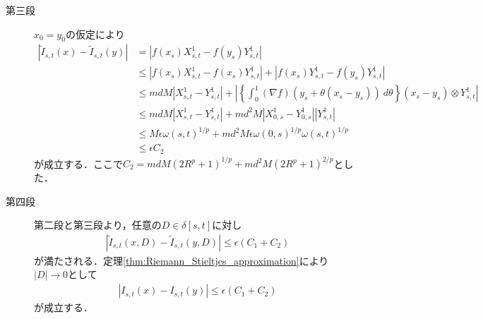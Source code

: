 \begin{prf}
\begin{description}
			\item[第三段]
				$x_0 = y_0$の仮定により
				\begin{align}
					\left| \tilde{I}_{s,t}(x) - \tilde{I}_{s,t}(y) \right|
					&= \left| f(x_s)X^1_{s,t} - f(y_s)Y^1_{s,t} \right| \\
					&\leq \left| f(x_s)X^1_{s,t} - f(x_s)Y^1_{s,t} \right|
						+ \left| f(x_s)Y^1_{s,t} - f(y_s)Y^1_{s,t} \right| \\
					&\leq mdM \left| X^1_{s,t} - Y^1_{s,t} \right|
						+ \left| \left\{ \int_0^1 (\nabla f)(y_s + \theta(x_s - y_s))\ d\theta \right\}
						(x_s - y_s) \otimes Y^1_{s,t} \right| \\
					&\leq mdM \left| X^1_{s,t} - Y^1_{s,t} \right|
						+ m d^2 M \left| X^1_{0,s} - Y^1_{0,s}\right| \left| Y^1_{s,t} \right| \\
					&\leq M \epsilon \omega(s,t)^{1/p} + m d^2 M \epsilon \omega(0,s)^{1/p} \omega(s,t)^{1/p} \\
					&\leq \epsilon C_2 
				\end{align}
				が成立する．ここで$C_2 = mdM \left( 2 R^p + 1 \right)^{1/p} + m d^2 M \left( 2 R^p + 1 \right)^{2/p}$とした．
				
			\item[第四段]
				第二段と第三段より，任意の$D \in \delta[s,t]$に対し
				\begin{align}
					\left| \tilde{I}_{s,t}(x,D) - \tilde{I}_{s,t}(y,D) \right|
					\leq \epsilon (C_1 + C_2)
				\end{align}
				が満たされる．定理\ref{thm:Riemann_Stieltjes_approximation}により
				$|D| \longrightarrow 0$として
				\begin{align}
					\left| I_{s,t}(x) - I_{s,t}(y) \right|
					\leq \epsilon (C_1 + C_2)
				\end{align}
				が成立する．
				\QED
		\end{description}
	\end{prf}
	

